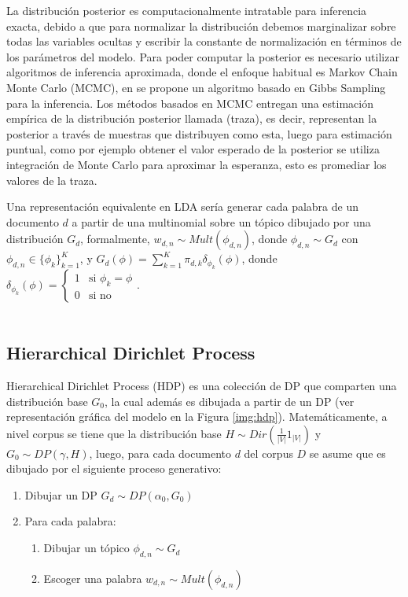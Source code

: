 \documentclass[letterpaper,12pt,oneside]{book} %
\begin{document}
La distribución posterior es computacionalmente intratable para inferencia exacta, debido a que para normalizar la distribución debemos marginalizar sobre todas las variables ocultas y escribir la constante de normalización en términos de los parámetros del modelo. Para poder computar la posterior es necesario utilizar algoritmos de inferencia aproximada, donde el enfoque habitual es Markov Chain Monte Carlo (MCMC), en \citep{griffiths2004finding} se propone un algoritmo basado en Gibbs Sampling para la inferencia. Los métodos basados en MCMC entregan una estimación empírica de la distribución posterior llamada (traza), es decir, representan la posterior a través de muestras que distribuyen como esta, luego para estimación puntual, como por ejemplo obtener el valor esperado de la posterior se utiliza integración de Monte Carlo para aproximar la esperanza, esto es promediar los valores de la traza.


Una representación equivalente en LDA sería generar cada palabra de un documento $d$ a partir de una multinomial sobre un tópico dibujado por una distribución $G_{d}$, formalmente, $w_{d,n}\sim Mult(\phi_{d,n})$, donde $\phi_{d,n} \sim G_{d}$ con $\phi_{d,n} \in \{\phi_{k}\}_{k=1}^{K}$, y $G_{d}(\phi)=\sum_{k=1}^{K}\pi_{d, k}\delta_{\phi_{k}}(\phi)$, donde $\delta_{\phi_{k}}(\phi) = \begin{cases}
    1 & \text{si $\phi_{k}=\phi$}  \\
    0 & \text{si no}
  \end{cases}$.\\\\

\subsection{Hierarchical Dirichlet Process}



Hierarchical Dirichlet Process (HDP) es una colección de DP que comparten una distribución base $G_{0}$, la cual además es dibujada a partir de un DP (ver representación gráfica del modelo en la Figura \ref{img:hdp}). Matemáticamente, a nivel corpus se tiene que la distribución base $H \sim Dir(\frac{1}{|V|}1_{|V|})$ y $G_{0} \sim DP(\gamma, H)$, luego, para cada documento $d$ del corpus $D$ se asume que es dibujado por el siguiente proceso generativo:
\begin{enumerate}
    \item Dibujar un DP $G_{d} \sim DP(\alpha_{0}, G_{0})$
    \item Para cada palabra:
    \begin{enumerate}
        \item Dibujar un tópico $\phi_{d,n}\sim G_{d}$
        \item Escoger una palabra $w_{d,n} \sim Mult(\phi_{d,n})$
    \end{enumerate}
\end{enumerate}
\end{document}
